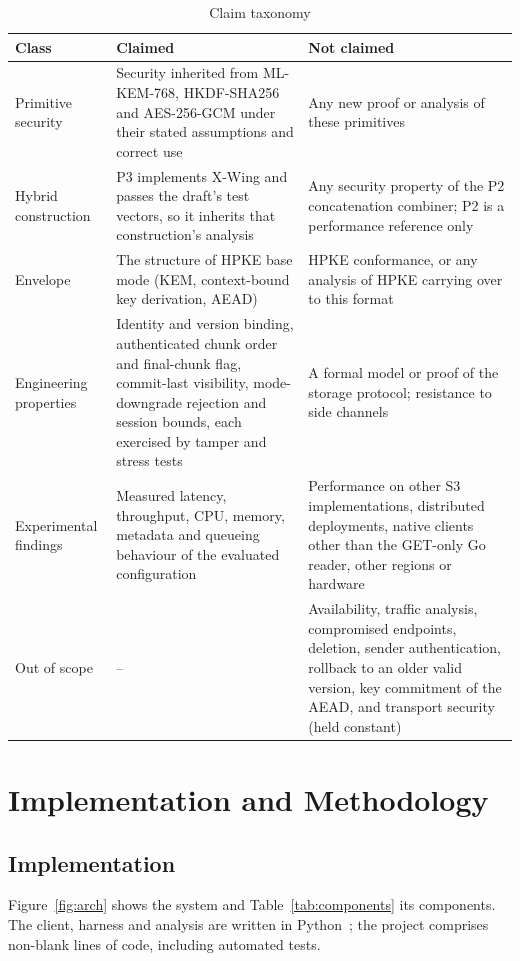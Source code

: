 \documentclass[conference]{IEEEtran}
\begin{document}
\begin{table}[t]
\caption{Claim taxonomy}
\label{tab:claims}
\centering\footnotesize
\begin{tabular}{p{2.5cm}p{7.2cm}p{6.6cm}}
\toprule
Class & Claimed & Not claimed \\
\midrule
Primitive security & Security inherited from ML-KEM-768, HKDF-SHA256 and AES-256-GCM under their stated assumptions and correct use & Any new proof or analysis of these primitives \\
Hybrid construction & P3 implements X-Wing and passes the draft's test vectors, so it inherits that construction's analysis & Any security property of the P2 concatenation combiner; P2 is a performance reference only \\
Envelope & The structure of HPKE base mode (KEM, context-bound key derivation, AEAD) & HPKE conformance, or any analysis of HPKE carrying over to this format \\
Engineering properties & Identity and version binding, authenticated chunk order and final-chunk flag, commit-last visibility, mode-downgrade rejection and session bounds, each exercised by tamper and stress tests & A formal model or proof of the storage protocol; resistance to side channels \\
Experimental findings & Measured latency, throughput, CPU, memory, metadata and queueing behaviour of the evaluated configuration & Performance on other S3 implementations, distributed deployments, native clients other than the GET-only Go reader, other regions or hardware \\
Out of scope & -- & Availability, traffic analysis, compromised endpoints, deletion, sender authentication, rollback to an older valid version, key commitment of the AEAD, and transport security (held constant) \\
\bottomrule
\end{tabular}
\end{table}

\section{Implementation and Methodology}\label{sec:method}
\subsection{Implementation}\label{sec:impl}
Figure~\ref{fig:arch} shows the system and Table~\ref{tab:components} its components. The client,
harness and analysis are written in Python~\PythonVersion; the project comprises \LocTotal{}
non-blank lines of code, including \TestCount{} automated tests.
\end{document}
